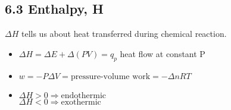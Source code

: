 \subsection{6.3 Enthalpy, H}
    \vspace*{0.2em}
    $\Delta H$ tells us about heat transferred during chemical reaction.
    \begin{itemize}
        \itemsep0em
        \item $\Delta H = \Delta E + \Delta(PV) = q_p$ heat flow at constant P
        \item $w = -P \Delta V = \text{pressure-volume work} = - \Delta n R T$
        \item $\Delta H > 0 \Rightarrow \text{endothermic}$\\
              $\Delta H < 0 \Rightarrow \text{exothermic}$
    \end{itemize}